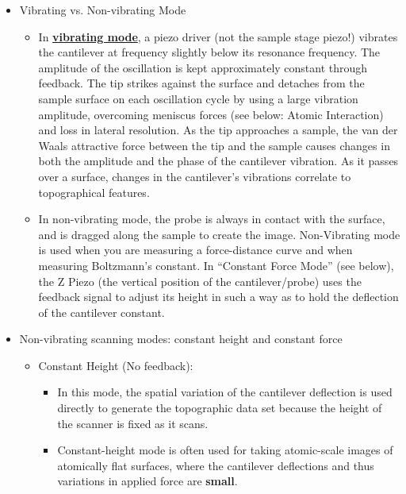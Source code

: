 \documentclass{../lab}
\begin{document}
\begin{itemize}
    \item Vibrating vs. Non-vibrating Mode

    \begin{itemize}
        \item In \href{http://experimentationlab.berkeley.edu/sites/default/files/AFMImages/7.2.\%20tip\%20sample\%20Vibrating.flv\_converted.mp4}{\textbf{vibrating mode}}, a piezo driver (not the sample stage piezo!) vibrates the cantilever at frequency slightly below its resonance frequency. The amplitude of the oscillation is kept approximately constant through feedback.  The tip strikes against the surface and detaches from the sample surface on each oscillation cycle by using a large vibration amplitude, overcoming meniscus forces (see below: Atomic Interaction) and loss in lateral resolution.  As the tip approaches a sample, the van der Waals attractive force between the tip and the sample causes changes in both the amplitude and the phase of the cantilever vibration.  As it passes over a surface, changes in the cantilever’s vibrations correlate to topographical features.

        \item In non-vibrating mode, the probe is always in contact with the surface, and is dragged along the sample to create the image.  Non-Vibrating mode is used when you are measuring a force-distance curve and when measuring Boltzmann's constant. In ``Constant Force Mode'' (see below), the Z Piezo (the vertical position of the cantilever/probe) uses the feedback signal to adjust its height in such a way as to hold the deflection of the cantilever constant.

    \end{itemize}

    \item Non-vibrating scanning modes: constant height and constant force

    \begin{itemize}
        \item Constant Height (No feedback):

        \begin{itemize}
            \item In this mode, the spatial variation of the cantilever deflection is used directly to generate the topographic data set because the height of the scanner is fixed as it scans.

            \item Constant-height mode is often used for taking atomic-scale images of atomically flat surfaces, where the cantilever deflections and thus variations in applied force are \textbf{small}.


\end{itemize}
\end{itemize}
\end{itemize}
\end{document}
